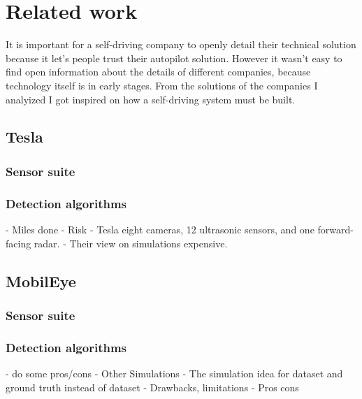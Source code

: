 \chapter{Related work}
\label{chap:relatedwork}

It is important for a self-driving company to openly detail their technical
solution because it let's people trust their autopilot solution. However it
wasn't easy to find open information about the details of different companies,
because technology itself is in early stages. From the solutions of the
companies I analyized I got inspired on how a self-driving system must be built. 

\section{Tesla}

\subsection{Sensor suite}

\subsection{Detection algorithms}
- Miles done
- Risk
- Tesla  eight cameras, 12 ultrasonic sensors, and one forward-facing radar.
  - Their view on simulations
expensive.
\section{MobilEye}

\subsection{Sensor suite}

\subsection{Detection algorithms}

  -  do some pros/cons
- Other Simulations
- The simulation idea for dataset and ground truth instead of dataset
  - Drawbacks, limitations
  - Pros cons


